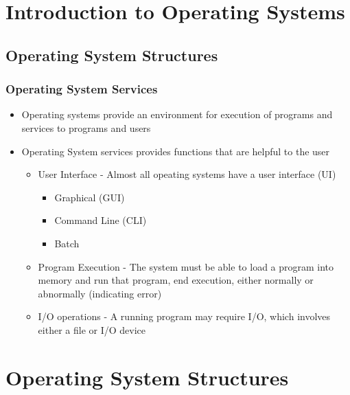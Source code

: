 \documentclass{book/custombook}
\author{Dinal Atapattu}
\begin{document}
    \maketitle
    \tableofcontents
    \chapter{Introduction to Operating Systems}
        \section{Operating System Structures}
            \subsection{Operating System Services}
                \begin{itemize}
                    \item Operating systems provide an environment for execution of programs and services to programs
                    and users
                    \item Operating System services provides functions that are helpful to the user
                        \begin{itemize}
                            \item User Interface - Almost all opeating systems have a user interface (UI)
                            \begin{itemize}
                                \item Graphical (GUI)
                                \item Command Line (CLI)
                                \item Batch
                            \end{itemize}
                            \item Program Execution - The system must be able to load a program into memory and run that
                            program, end execution, either normally or abnormally (indicating error)
                            \item I/O operations - A running program may require I/O, which involves either a file or I/O device
                        \end{itemize}
                \end{itemize}
    \chapter{Operating System Structures}
\end{document}
